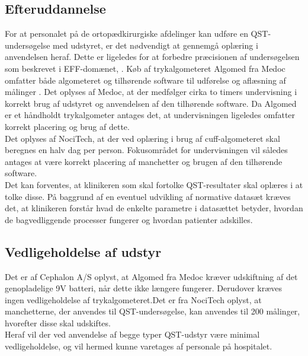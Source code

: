 \subsection{Efteruddannelse}
For at personalet på de ortopædkirurgiske afdelinger kan udføre en QST-undersøgelse med udstyret, er det nødvendigt at gennemgå oplæring i anvendelsen heraf. Dette er ligeledes for at forbedre præcisionen af undersøgelsen som beskrevet i EFF-domænet, . Køb af trykalgometeret Algomed fra Medoc omfatter både algometeret og tilhørende software til udførelse og aflæsning af målinger \citep{AlgomedData}. Det oplyses af Medoc, at der medfølger cirka to timers undervisning i korrekt brug af udstyret og anvendelsen af den tilhørende software. Da Algomed er et håndholdt trykalgometer antages det, at undervisningen ligeledes omfatter korrekt placering og brug af dette. \\
Det oplyses af NociTech, at der ved oplæring i brug af cuff-algometeret skal beregnes en halv dag per person. Fokusområdet for undervisningen vil således antages at være korrekt placering af manchetter og brugen af den tilhørende software.\\
Det kan forventes, at klinikeren som skal fortolke QST-resultater skal oplæres i at tolke disse. På baggrund af en eventuel udvikling af normative datasæt kræves det, at klinikeren forstår hvad de enkelte parametre i datasættet betyder, hvordan de bagvedliggende processer fungerer og hvordan patienter adskilles. 

\subsection{Vedligeholdelse af udstyr}
Det er af Cephalon A/S oplyst, at Algomed fra Medoc kræver udskiftning af det genopladelige 9V batteri, når dette ikke længere fungerer. Derudover kræves ingen vedligeholdelse af trykalgometeret.Det er fra NociTech oplyst, at manchetterne, der anvendes til QST-undersøgelse, kan anvendes til 200 målinger, hvorefter disse skal udskiftes.\\
Heraf vil der ved anvendelse af begge typer QST-udstyr være minimal vedligeholdelse, og vil hermed kunne varetages af personale på hospitalet.

